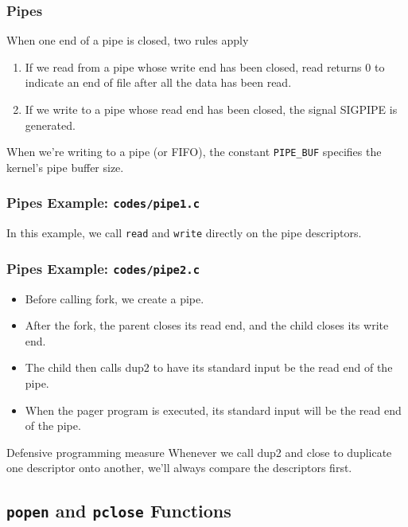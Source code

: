 \documentclass[newPxFont,sthlmFooter,nooffset]{beamer}
\begin{document}
\begin{frame}[t]
  \frametitle{Pipes}
When one end of a pipe is closed, two rules apply
\begin{enumerate}
\item If we read from a pipe whose write end has been closed, read returns 0 to indicate an end of file after all the data has been read.
\item If we write to a pipe whose read end has been closed, the signal SIGPIPE is generated.
\end{enumerate}

When we’re writing to a pipe (or FIFO), the constant \texttt{PIPE\_BUF} specifies the kernel’s pipe buffer size.
\end{frame}



\begin{frame}
  \frametitle{Pipes Example: \texttt{codes/pipe1.c}}
In this example, we call \texttt{read} and \texttt{write} directly on the pipe descriptors.


\end{frame}



\begin{frame}
  \frametitle{Pipes Example: \texttt{codes/pipe2.c}}

  \begin{itemize}
  \item Before calling fork, we create a pipe.
  \item After the fork, the parent closes its read end, and the child
    closes its write end.
  \item The child then calls dup2 to have its
    standard input be the read end of the pipe.
  \item When the pager program
    is executed, its standard input will be the read end of the pipe.
  \end{itemize}




\begin{block}{Defensive programming measure}
Whenever we call dup2 and close to duplicate one descriptor onto another, we’ll always compare the descriptors first.
\end{block}
\end{frame}

\subsection{\texttt{popen} and \texttt{pclose} Functions}
\end{document}
